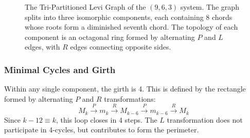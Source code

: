 \documentclass[12pt,letterpaper]{amsart}
\begin{document}
\begin{figure}[H]
    \caption{The Tri-Partitioned Levi Graph of the $(9,6,3)$ system. The graph splits into three isomorphic components, each containing 8 chords whose roots form a diminished seventh chord. The topology of each component is an octagonal ring formed by alternating $P$ and $L$ edges, with $R$ edges connecting opposite sides.}
    \label{fig:equal_split}
\end{figure}

\subsubsection{Minimal Cycles and Girth}
Within any single component, the girth is 4. This is defined by the rectangle formed by alternating $P$ and $R$ transformations:
\[ M_k \xrightarrow{P} m_k \xrightarrow{R} M_{k-6} \xrightarrow{P} m_{k-6} \xrightarrow{R} M_k \]
Since $k-12 \equiv k$, this loop closes in 4 steps. The $L$ transformation does not participate in 4-cycles, but contributes to form the perimeter.
\end{document}
